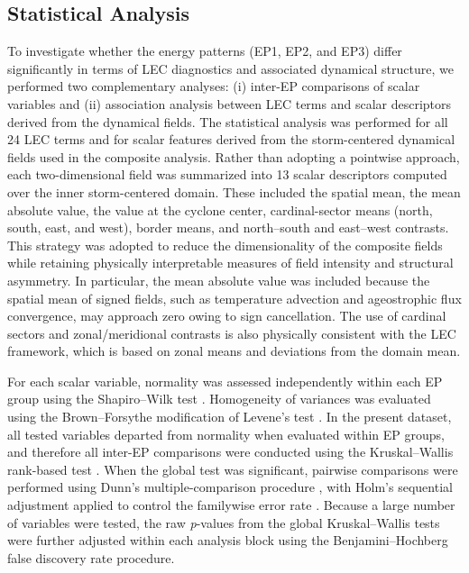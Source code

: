\documentclass[pdflatex,sn-chicago]{sn-jnl}%
\theoremstyle{plain}
\theoremstyle{definition}
\theoremstyle{remark}
\theoremstyle{definition}
\begin{document}
\subsection{Statistical Analysis}

To investigate whether the energy patterns (EP1, EP2, and EP3) differ significantly in terms of LEC diagnostics and associated dynamical structure, we performed two complementary analyses: (i) inter-EP comparisons of scalar variables and (ii) association analysis between LEC terms and scalar descriptors derived from the dynamical fields. The statistical analysis was performed for all 24 LEC terms and for scalar features derived from the storm-centered dynamical fields used in the composite analysis. Rather than adopting a pointwise approach, each two-dimensional field was summarized into 13 scalar descriptors computed over the inner storm-centered domain. These included the spatial mean, the mean absolute value, the value at the cyclone center, cardinal-sector means (north, south, east, and west), border means, and north--south and east--west contrasts. This strategy was adopted to reduce the dimensionality of the composite fields while retaining physically interpretable measures of field intensity and structural asymmetry. In particular, the mean absolute value was included because the spatial mean of signed fields, such as temperature advection and ageostrophic flux convergence, may approach zero owing to sign cancellation. The use of cardinal sectors and zonal/meridional contrasts is also physically consistent with the LEC framework, which is based on zonal means and deviations from the domain mean.

For each scalar variable, normality was assessed independently within each EP group using the Shapiro--Wilk test \citep{shapiro1965analysis}. Homogeneity of variances was evaluated using the Brown--Forsythe modification of Levene's test \citep{brown1974robust}. In the present dataset, all tested variables departed from normality when evaluated within EP groups, and therefore all inter-EP comparisons were conducted using the Kruskal--Wallis rank-based test \citep{kruskal1952use}. When the global test was significant, pairwise comparisons were performed using Dunn's multiple-comparison procedure \citep{dunn1964multiple}, with Holm's sequential adjustment applied to control the familywise error rate \citep{holm1979simple}. Because a large number of variables were tested, the raw \emph{p}-values from the global Kruskal--Wallis tests were further adjusted within each analysis block using the Benjamini--Hochberg false discovery rate procedure.
\end{document}
